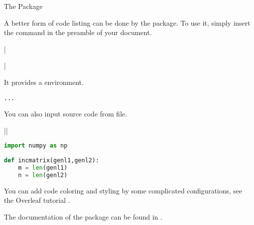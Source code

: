 \begin{frame}[fragile]{The  Package}

A better form of code listing can be done by the  package. To use it, simply insert the command in the preamble of your document.

\begin{command}
\LC|\usepackage{listings}|
\end{command}

It provides a  environment.

\begin{command}
\begin{LCL}
\begin{lstlisting}[language=name]
  ...
\end{lstlisting}
\end{LCL}
\end{command}

You can also input source code from file.

\begin{command}
\LC||
\end{command}

\end{frame}

\begin{frame}[fragile]

\begin{latexexample}
\begin{lstlisting}[language=Python]
import numpy as np
    
def incmatrix(genl1,genl2):
    m = len(genl1)
    n = len(genl2)
\end{lstlisting}
\end{latexexample}

You can add code coloring and styling by some complicated configurations, see the Overleaf tutorial . \medskip

The documentation of the  package can be found in .


\end{frame}

